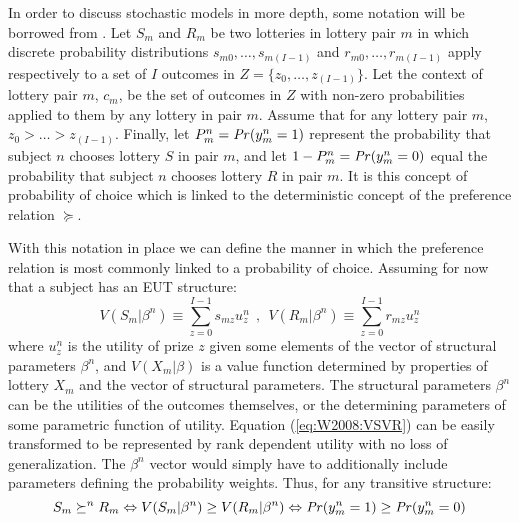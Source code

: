 \documentclass[../main.tex]{subfiles}
\begin{document}
In order to discuss stochastic models in more depth, some notation will be borrowed from \textcite{Wilcox2008}.
Let $S_m$ and $R_m$ be two lotteries in lottery pair $m$ in which discrete probability distributions $s_{m0} , \ldots , s_{m(I-1)}$ and $r_{m0} , \ldots , r_{m(I-1)}$ apply respectively to a set of $I$ outcomes in $Z = \lbrace z_0 , \ldots , z_{(I-1)} \rbrace$.
Let the context of lottery pair $m$, $c_m$, be the set of outcomes in $Z$ with non-zero probabilities applied to them by any lottery in pair $m$.
Assume that for any lottery pair $m$, $z_0 > \ldots > z_{(I-1)}$.
Finally, let $P_m^n = {\mathit{Pr}}(y_m^n = 1) $ represent the probability that subject $n$ chooses lottery $S$ in pair $m$, and let $1-P_m^n = {\mathit{Pr}}(y_m^n = 0)$ equal the probability that subject $n$ chooses lottery $R$ in pair $m$.
It is this concept of probability of choice which is linked to the deterministic concept of the preference relation $\succeq$.

With this notation in place we can define the manner in which the preference relation  is most commonly linked to a probability of choice.
Assuming for now that a subject has an EUT structure: 
\begin{equation}
	\label{eq:W2008:VSVR}
	V( S_m | \beta^n )  \equiv \sum_{z=0}^{I-1} s_{mz} u^n_z   ~~,~~  V( R_m | \beta^n ) \equiv \sum_{z=0}^{I-1} r_{mz} u^n_z
\end{equation}
\noindent where $u_z^n$ is the utility of prize $z$ given some elements of the vector of structural parameters $\beta^n$, and $V(X_m|\beta)$ is a value function determined by properties of lottery $X_m$ and the vector of structural parameters.
The structural parameters $\beta^n$ can be the utilities of the outcomes themselves, or the determining parameters of some parametric function of utility.
Equation (\ref{eq:W2008:VSVR}) can be easily transformed to be represented by rank dependent utility with no loss of generalization.
The $\beta^n$ vector would simply have to additionally include parameters defining the probability weights.
Thus, for any transitive structure:
\begin{equation}
	S_m \succeq^n R_m \Leftrightarrow  V( S_m | \beta^n ) \geq V( R_m | \beta^n ) \Leftrightarrow {\ensuremath{\mathit{Pr}}}( y^n_m=1 ) \geq {\ensuremath{\mathit{Pr}}}( y^n_m=0 )
\end{equation}
\end{document}
